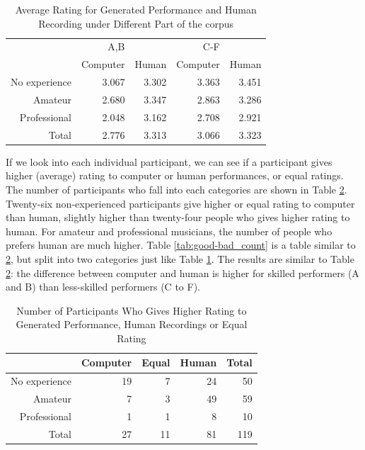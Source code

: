\begin{table}
   \centering
   \caption{Average Rating for Generated Performance and Human Recording under Different Part of the corpus}
   \label{tab:good-bad_rating}
   \begin{tabular}{r|rr|rr}
\hline
&A,B&&C-F&\\
&Computer &Human &Computer &Human \\
\hline
No experience&3.067&3.302&3.363&3.451\\
Amateur&2.680&3.347&2.863&3.286\\
Professional&2.048&3.162&2.708&2.921\\
\hline
Total&2.776&3.313&3.066&3.323\\
\hline
   \end{tabular}
\end{table}

If we look into each individual participant, we can see if a participant gives higher (average) rating to computer or human performances, or equal ratings. The number of participants who fall into each categories are shown in Table \ref{tab:avg_count}. Twenty-six non-experienced participants give higher or equal rating to computer than human, slightly higher than twenty-four people who gives higher rating to human. For amateur and professional musicians, the number of people who prefers human are much higher. Table \ref{tab:good-bad_count} is a table similar to \ref{tab:avg_count}, but split into two categories just like Table \ref{tab:good-bad_rating}. The results are similar to Table \ref{tab:avg_count}: the difference between computer and human is higher for skilled performers (A and B) than less-skilled performers (C to F).


\begin{table}
   \centering
   \caption{Number of Participants Who Gives Higher Rating to Generated Performance, Human Recordings or Equal Rating}
   \label{tab:avg_count}
   \begin{tabular}{r|rrr|r}
      \hline
      &Computer&Equal&Human&Total\\
      \hline
      No experience&19&7&24&50\\
      Amateur&7&3&49&59\\
      Professional&1&1&8&10\\
      \hline
      Total&27&11&81&119\\
      \hline
   \end{tabular}
\end{table}

